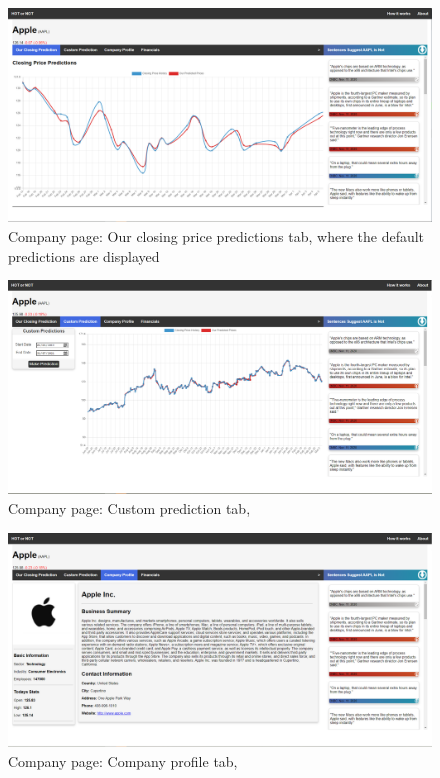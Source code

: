 \documentclass{l4proj}
\begin{document}
\begin{appendices}
\begin{figure}[h]
    \centering
    \includegraphics[width=\linewidth]{images/upload/a_ourtab.PNG}
    \caption{Company page: Our closing price predictions tab, where the default predictions are displayed }
    \label{fig:a_ourtab}
\end{figure}

\bigskip

\begin{figure}[h]
    \centering
    \includegraphics[width=\linewidth]{images/upload/a_customtab.PNG}
    \caption{Company page: Custom prediction tab, }
    \label{fig:a_customtab}
\end{figure}

\bigskip

\begin{figure}[h]
    \centering
    \includegraphics[width=\linewidth]{images/upload/a_profiletab.PNG}
    \caption{Company page: Company profile tab, }
    \label{fig:a_profile}
\end{figure}


\end{appendices}
\end{document}
